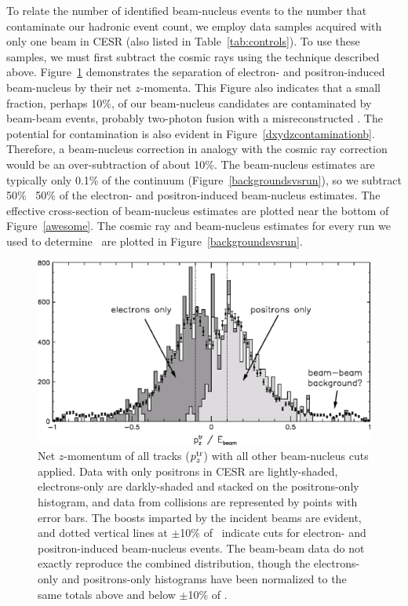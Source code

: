 \documentclass{cornell}
\begin{document}
To relate the number of identified beam-nucleus events to the number
that contaminate our hadronic event count, we employ data samples
acquired with only one beam in CESR (also listed in
Table~\ref{tab:controls}).  To use these samples, we must first
subtract the cosmic rays using the technique described above.
Figure~\ref{beamgaspz} demonstrates the separation of electron- and
positron-induced beam-nucleus by their net $z$-momenta.  This Figure
also indicates that a small fraction, perhaps 10\%, of our
beam-nucleus candidates are contaminated by beam-beam events, probably
two-photon fusion with a misreconstructed \dz.  The potential for
contamination is also evident in Figure~\ref{dxydzcontaminationb}.
Therefore, a beam-nucleus correction in analogy with the cosmic ray
correction would be an over-subtraction of about 10\%.  The
beam-nucleus estimates are typically only 0.1\% of the continuum
(Figure~\ref{backgroundsvsrun}), so we subtract 50\% \PM\ 50\% of the
electron- and positron-induced beam-nucleus estimates.  The effective
cross-section of beam-nucleus estimates are plotted near the bottom of
Figure~\ref{awesome}.  The cosmic ray and beam-nucleus estimates for
every run we used to determine \gee\ are plotted in
Figure~\ref{backgroundsvsrun}.

\begin{figure}[p]
  \begin{center}
    \includegraphics[width=\linewidth]{beamgaspz}
  \end{center}
  \caption[Distinguishing electron- and positron-induced beam-nucleus
  events with $z$ momentum]{\label{beamgaspz} Net $z$-momentum of all
  tracks ($p_z^{\mbox{\scriptsize tr}}$) with all other beam-nucleus cuts applied.
  Data with only positrons in CESR are lightly-shaded, electrons-only
  are darkly-shaded and stacked on the positrons-only histogram, and
  data from collisions are represented by points with error bars.  The
  boosts imparted by the incident beams are evident, and dotted
  vertical lines at $\pm$10\% of \ebeam\ indicate cuts for electron-
  and positron-induced beam-nucleus events.  The beam-beam data do not
  exactly reproduce the combined distribution, though the
  electrons-only and positrons-only histograms have been normalized to
  the same totals above and below $\pm$10\% of \ebeam.}
\end{figure}
\end{document}
